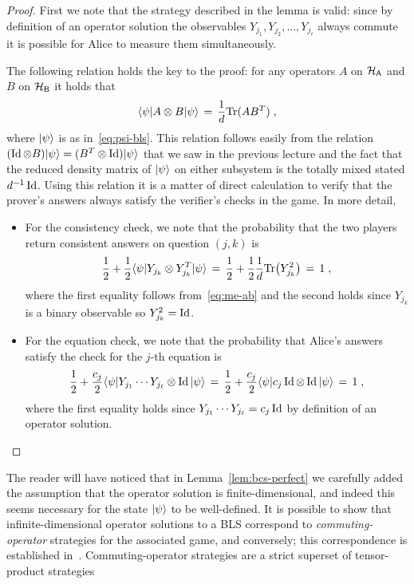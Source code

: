 \begin{proof}
First we note that the strategy described in the lemma is valid: since by definition of an operator solution the observables $Y_{j_1},Y_{j_2},\ldots,Y_{j_\ell}$ always commute it is possible for Alice to measure them simultaneously. 

The following relation holds the key to the proof: for any operators $A$ on $\mathcal{H}_{\textsf{A}}$ and $B$ on $\mathcal{H}_{\textsf{B}}$ it holds that 
\begin{equation}\label{eq:me-ab}
\langle\psi| A\otimes B |\psi\rangle \,=\, \frac{1}{d}\mbox{\rm Tr}(AB^T)\;,
\end{equation}
where $|\psi\rangle$ is as in~\eqref{eq:psi-bls}. 
This relation follows easily from the relation $(\mathop{\rm Id}\nolimits\otimes B)|\psi\rangle = (B^T \otimes \mathop{\rm Id}\nolimits) |\psi\rangle$ that we saw in the previous lecture and the fact that the reduced density matrix of $|\psi\rangle$ on either subsystem is the totally mixed stated $d^{-1}\mathop{\rm Id}\nolimits$. Using this relation it is a matter of direct calculation to verify that the prover's answers always satisfy the verifier's checks in the game. In more detail, 
\begin{itemize}
\item For the consistency check, we note that the probability that the two players return consistent answers on question $(j,k)$ is 
\[ \frac{1}{2}+\frac{1}{2}\langle\psi| Y_{j_k} \otimes Y_{j_k}^T |\psi\rangle \,=\, \frac{1}{2}+\frac{1}{2}\frac{1}{d} \mbox{\rm Tr}\big(Y_{j_k}^2\big) \,=\, 1\;,\]
where the first equality follows from~\eqref{eq:me-ab} and the second holds since $Y_{j_k}$ is a binary observable so $Y_{j_k}^2 = \mathop{\rm Id}\nolimits$. 
\item For the equation check, we note that the probability that Alice's answers satisfy the check for the $j$-th equation is 
\[ \frac{1}{2}+\frac{c_j}{2}\langle\psi| Y_{j_1}\cdots Y_{j_\ell} \otimes \mathop{\rm Id}\nolimits |\psi\rangle \,=\,\frac{1}{2}+\frac{c_j}{2} \langle\psi| c_j\mathop{\rm Id}\nolimits \otimes \mathop{\rm Id}\nolimits |\psi\rangle\,=\,1\;,\]
where the first equality holds since $Y_{j_1}\cdots Y_{j_\ell} =c_j\mathop{\rm Id}\nolimits$ by definition of an operator solution.
\end{itemize}
\end{proof}

\begin{remark}
The reader will have noticed that in Lemma~\ref{lem:bcs-perfect} we carefully added the assumption that the operator solution is finite-dimensional, and indeed this seems necessary for the state $|\psi\rangle$ to be well-defined. It is possible to show that infinite-dimensional operator solutions to a BLS correspond to \emph{commuting-operator} strategies for the associated game, and conversely; this correspondence is established in~\cite{cleve2017perfect}. Commuting-operator strategies are a strict superset of tensor-product strategies  
\end{remark}

